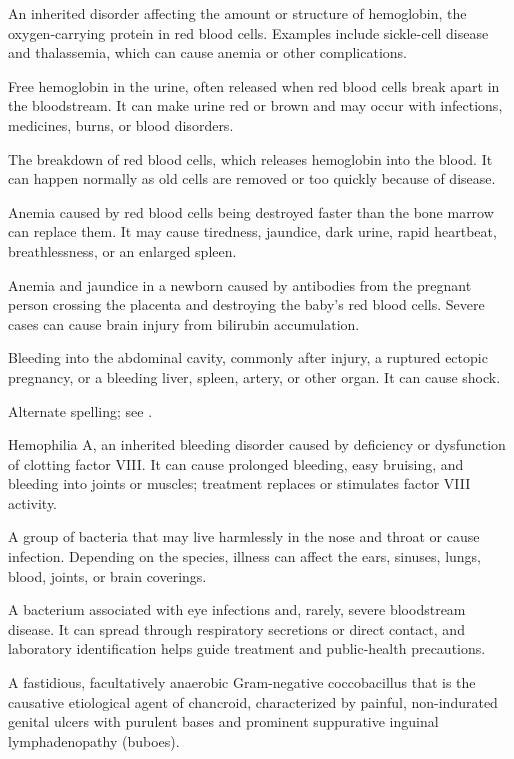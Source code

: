 An inherited disorder affecting the amount or structure of hemoglobin, the oxygen-carrying protein in red blood cells. Examples include sickle-cell disease and thalassemia, which can cause anemia or other complications.

 Free hemoglobin in the urine, often released when red blood cells break apart in the bloodstream. It can make urine red or brown and may occur with infections, medicines, burns, or blood disorders.

 The breakdown of red blood cells, which releases hemoglobin into the blood. It can happen normally as old cells are removed or too quickly because of disease.

 Anemia caused by red blood cells being destroyed faster than the bone marrow can replace them. It may cause tiredness, jaundice, dark urine, rapid heartbeat, breathlessness, or an enlarged spleen.

 Anemia and jaundice in a newborn caused by antibodies from the pregnant person crossing the placenta and destroying the baby’s red blood cells. Severe cases can cause brain injury from bilirubin accumulation.

 Bleeding into the abdominal cavity, commonly after injury, a ruptured ectopic pregnancy, or a bleeding liver, spleen, artery, or other organ. It can cause shock.

 Alternate spelling; see .

 Hemophilia A, an inherited bleeding disorder caused by deficiency or dysfunction of clotting factor VIII. It can cause prolonged bleeding, easy bruising, and bleeding into joints or muscles; treatment replaces or stimulates factor VIII activity.

 A group of bacteria that may live harmlessly in the nose and throat or cause infection. Depending on the species, illness can affect the ears, sinuses, lungs, blood, joints, or brain coverings.

 A bacterium associated with eye infections and, rarely, severe bloodstream disease. It can spread through respiratory secretions or direct contact, and laboratory identification helps guide treatment and public-health precautions.

 A fastidious, facultatively anaerobic Gram-negative coccobacillus that is the causative etiological agent of chancroid, characterized by painful, non-indurated genital ulcers with purulent bases and prominent suppurative inguinal lymphadenopathy (buboes).


